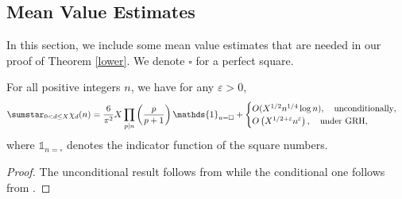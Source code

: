 \documentclass[twoside,leqno,10pt, A4]{amsart}
\begin{document}
\subsection{Mean Value Estimates}

  In this section, we include some mean value estimates that are needed in our proof of Theorem \ref{lower}. We denote $\square$ for a perfect square.
\begin{lemma}\label{character}
  For all positive integers $n$,  we have for any $\varepsilon>0$,
\begin{align*}
    \sumstar_{0<d \leq X} \chi_{d}(n)=\frac{6}{\pi^2}X\prod_{p|n}\left(\frac{p}{p+1}\right)\mathds{1}_{n=\square}+
\begin{cases}
  O(X^{1/2}n^{1/4}\log n), \quad \text{unconditionally}, \\
  O\left(X^{1/2+\varepsilon}n^{\varepsilon}\right), \quad \text{under GRH},
\end{cases}
\end{align*}
  where $\mathds{1}_{n=\square}$ denotes the indicator function of the square numbers.
  \end{lemma}
\begin{proof}
  The unconditional result follows from \cite[Lemma  4.1]{GSound} while the conditional one follows from \cite[Lemma 1]{DM24}.
  \end{proof}
\end{document}
